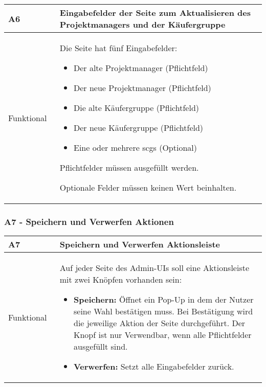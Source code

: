 \begin{center}
    \begin{tabular}{ |p{0.2\linewidth}|p{0.8\linewidth}| } 
        \hline
        \rowcolor{lightgray}
        \textbf{A6} & \textbf{Eingabefelder der Seite zum Aktualisieren des Projektmanagers und der Käufergruppe} \\
        \hline
        Funktional & Die Seite hat fünf Eingabefelder:
        \begin{itemize}
            \item Der alte Projektmanager (Pflichtfeld)
            \item Der neue Projektmanager (Pflichtfeld)
            \item Die alte Käufergruppe (Pflichtfeld)
            \item Der neue Käufergruppe (Pflichtfeld)
            \item Eine oder mehrere \glspl{scg} (Optional)
        \end{itemize} 
        Pflichtfelder müssen ausgefüllt werden.
       
        Optionale Felder müssen keinen Wert beinhalten.\\ 
        \hline
    \end{tabular}
\end{center}

\subsubsection[A7 - Speichern und Verwerfen Aktionen]{A7 - Speichern und Verwerfen Aktionen}

\begin{center}
    \begin{tabular}{ |p{0.2\linewidth}|p{0.8\linewidth}| } 
        \hline
        \rowcolor{lightgray}
        \textbf{A7} & \textbf{Speichern und Verwerfen Aktionsleiste} \\
        \hline
        Funktional &  Auf jeder Seite des Admin-UIs soll eine Aktionsleiste mit zwei Knöpfen vorhanden sein:
        \begin{itemize}
            \item \textbf{Speichern:} Öffnet ein Pop-Up in dem der Nutzer seine Wahl bestätigen muss. Bei Bestätigung wird die jeweilige Aktion der Seite durchgeführt. Der Knopf ist nur Verwendbar, wenn alle Pflichtfelder ausgefüllt sind.
            \item \textbf{Verwerfen:} Setzt alle Eingabefelder zurück.
        \end{itemize}\\
        \hline
    \end{tabular}
\end{center}

